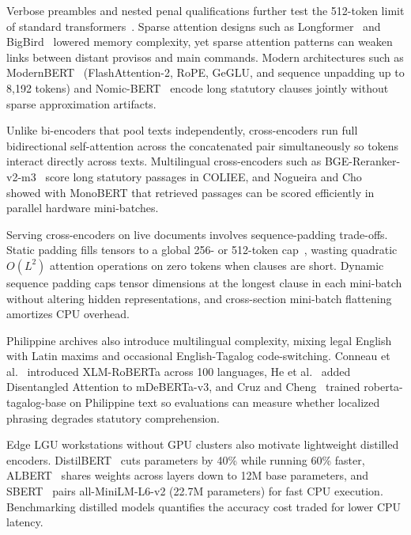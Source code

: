     Verbose preambles and nested penal qualifications further test the 512-token limit of standard transformers~\cite{chalkidis2022lexglue}. Sparse attention designs such as Longformer~\cite{beltagy2020longformer} and BigBird~\cite{zaheer2020bigbird} lowered memory complexity, yet sparse attention patterns can weaken links between distant provisos and main commands. Modern architectures such as ModernBERT~\cite{warner2024modernbert} (FlashAttention-2, RoPE, GeGLU, and sequence unpadding up to 8,192 tokens) and Nomic-BERT~\cite{nussbaum2024nomic} encode long statutory clauses jointly without sparse approximation artifacts.

    Unlike bi-encoders that pool texts independently, cross-encoders run full bidirectional self-attention across the concatenated pair simultaneously so tokens interact directly across texts. Multilingual cross-encoders such as BGE-Reranker-v2-m3~\cite{xiao2024bge} score long statutory passages in COLIEE, and Nogueira and Cho~\cite{nogueira2020passage} showed with MonoBERT that retrieved passages can be scored efficiently in parallel hardware mini-batches.

    Serving cross-encoders on live documents involves sequence-padding trade-offs. Static padding fills tensors to a global 256- or 512-token cap~\cite{devlin2019bert}, wasting quadratic $O(L^2)$ attention operations on zero tokens when clauses are short. Dynamic sequence padding caps tensor dimensions at the longest clause in each mini-batch without altering hidden representations, and cross-section mini-batch flattening amortizes CPU overhead.

    Philippine archives also introduce multilingual complexity, mixing legal English with Latin maxims and occasional English-Tagalog code-switching. Conneau et al.~\cite{conneau2020xlmr} introduced XLM-RoBERTa across 100 languages, He et al.~\cite{he2023debertav3} added Disentangled Attention to mDeBERTa-v3, and Cruz and Cheng~\cite{cruz2020tagalog} trained roberta-tagalog-base on Philippine text so evaluations can measure whether localized phrasing degrades statutory comprehension.

    Edge LGU workstations without GPU clusters also motivate lightweight distilled encoders. DistilBERT~\cite{sanh2019distilbert} cuts parameters by 40\% while running 60\% faster, ALBERT~\cite{lan2020albert} shares weights across layers down to 12M base parameters, and SBERT~\cite{reimers2019sentencebert} pairs all-MiniLM-L6-v2 (22.7M parameters) for fast CPU execution. Benchmarking distilled models quantifies the accuracy cost traded for lower CPU latency.

